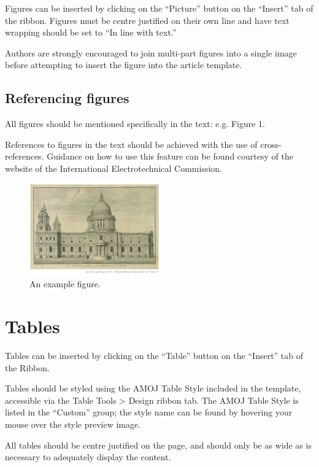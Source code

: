 \documentclass[10pt]{article}
\begin{document}
Figures can be inserted by clicking on the ``Picture'' button on the ``Insert'' tab of the ribbon. Figures must be centre justified on their own line and have text wrapping should be set to ``In line with text.''

Authors are strongly encouraged to join multi-part figures into a single image before attempting to insert the figure into the article template.

\subsection{Referencing figures}
\label{referencing_figures}
All figures should be mentioned specifically in the text: e.g. Figure 1.

References to figures in the text should be achieved with the use of cross-references. Guidance on how to use this feature can be found courtesy of the website of the International Electrotechnical Commission.

\begin{figure}
  \centering
    \caption{An example figure.}
    \label{figure:exampleFigure}
    \includegraphics[keepaspectratio=true,width=0.5\textwidth]{example_figure.png}
\end{figure}

\section{Tables}
\label{tables}
Tables can be inserted by clicking on the “Table” button on the “Insert” tab of the Ribbon.

Tables should be styled using the AMOJ Table Style included in the template, accessible via the Table Tools > Design ribbon tab. The AMOJ Table Style is listed in the “Custom” group; the style name can be found by hovering your mouse over the style preview image.

All tables should be centre justified on the page, and should only be as wide as is necessary to adequately display the content.
\end{document}

